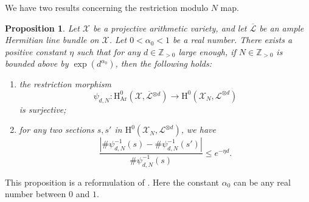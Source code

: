 \documentclass[JEP,XML,SOM,Unicode,published]{cedram}
\newenvironment{enumeratei}
{\bgroup\def\theenumi{\roman{enumi}}\def\theenumii{\arabic{enumii}}\begin{enumerate}}
{\end{enumerate}\egroup}
\theoremstyle{plain}
\newtheorem{prop}[thm]{Proposition}
\theoremstyle{definition}
\newcommand{\ho}{\mathrm{H}}
\newcommand{\X}{\mathcal{X}}
\newcommand{\Li}{\overline{\mathcal{L}}{}}
\newcommand{\li}{\mathcal{L}}
\newcommand{\Z}{\mathbb{Z}}
\begin{document}
We have two results concerning the restriction modulo $N$ map.
\begin{prop}\label{modN}
Let $\X$ be a projective arithmetic variety, and let $\Li$ be an ample Hermitian line bundle on $\X$. Let $0<\alpha_0<1$ be a real number. There exists a positive constant $\eta$ such that for any $d\in\Z_{>0}$ large enough, if $N\in \Z_{>0}$ is bounded above by $\exp(d^{\alpha_0})$, then the following holds:
\begin{enumeratei}
\item the restriction morphism
\[
\psi_{d,N}: \ho^0_{\mathrm{Ar}}(\X,\Li^{\otimes d}) \to \ho^0(\X_N,\li^{\otimes d})
\]
is surjective;
\item for any two sections $s,s'$ in $ \ho^0(\X_N,\li^{\otimes d})$, we have
\[
\frac{| \#\psi_{d,N}^{-1}(s)- \#\psi_{d,N}^{-1}(s') |}{\#\psi_{d,N}^{-1}(s)}\leq e^{-\eta d}.
\]
\end{enumeratei}
\end{prop}
This proposition is a reformulation of \cite[Prop.\,2.15]{Ch17}. Here the constant $\alpha_0$ can be any real number between $0$ and $1$.
\end{document}
